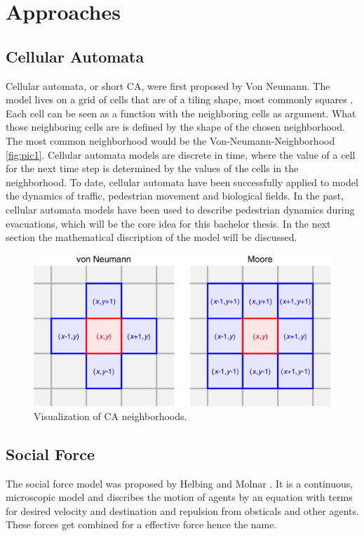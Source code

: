 \newpage
\section{Approaches}
\subsection{Cellular Automata}
Cellular automata, or short CA, were first proposed by Von Neumann. 
The model lives on a grid of cells that are of a tiling shape, most commonly squares \cite{Michi}.
Each cell can be seen as a function with the neighboring cells as argument. 
What those neighboring cells are is defined by the shape of the chosen neighborhood. 
The most common neighborhood would be the Von-Neumann-Neighborhood \autoref{fig:pic1}.
Cellular automata models are discrete in time, 
where the value of a cell for the next time step is determined by the values of the cells in the neighborhood. 
To date, cellular automata have been successfully applied to model the dynamics of traffic, pedestrian movement and biological fields. 
In the past, cellular automata models have been used to describe pedestrian dynamics during evacuations, which will be the core idea for this bachelor thesis.
In the next section the mathematical discription of the model will be discussed. 

\begin{figure}[h]
   \centering 
   \includegraphics[width=0.8\linewidth]{content/figures/CA_Umgebungen.png} 
   \caption{Visualization of CA neighborhoods.}
   \label{fig:pic1}
\end{figure}

\subsection{Social Force}
The social force model was proposed by Helbing and Molnar \cite{helbing1995social}.
It is a continuous, microscopic model and discribes the motion of agents by an equation with terms for desired velocity and destination and repulsion from obsticals and other agents.
These forces get combined for a effective force hence the name. 

